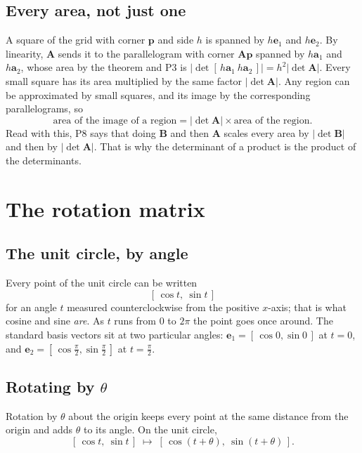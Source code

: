 \documentclass[11pt]{article}
\theoremstyle{plain}
\theoremstyle{definition}
\theoremstyle{remark}
\newcommand{\vc}[1]{\mathbf{#1}}
\newcommand{\mt}[1]{\mathbf{#1}}
\begin{document}
\subsection{Every area, not just one}
A square of the grid with corner $\vc{p}$ and side $h$ is spanned by $h\vc{e}_1$
and $h\vc{e}_2$. By linearity, $\mt{A}$ sends it to the parallelogram with
corner $\mt{A}\vc{p}$ spanned by $h\vc{a}_1$ and $h\vc{a}_2$, whose area by the
theorem and P3 is $|\det[\,h\vc{a}_1\ h\vc{a}_2\,]|=h^{2}|\det\mt{A}|$. Every
small square has its area multiplied by the same factor $|\det\mt{A}|$. Any
region can be approximated by small squares, and its image by the corresponding
parallelograms, so
\[
  \text{area of the image of a region}=|\det\mt{A}|\times\text{area of the region}.
\]
Read with this, P8 says that doing $\mt{B}$ and then $\mt{A}$ scales every area
by $|\det\mt{B}|$ and then by $|\det\mt{A}|$. That is why the determinant of a
product is the product of the determinants.

\section{The rotation matrix}

\subsection{The unit circle, by angle}
Every point of the unit circle can be written
\[
  [\,\cos t,\ \sin t\,]
\]
for an angle $t$ measured counterclockwise from the positive $x$-axis; that is
what cosine and sine \emph{are}. As $t$ runs from $0$ to $2\pi$ the point goes
once around. The standard basis vectors sit at two particular angles:
$\vc{e}_1=[\,\cos0,\sin0\,]$ at $t=0$, and
$\vc{e}_2=[\,\cos\frac{\pi}{2},\sin\frac{\pi}{2}\,]$ at $t=\frac{\pi}{2}$.

\subsection{Rotating by \texorpdfstring{$\theta$}{theta}}
Rotation by $\theta$ about the origin keeps every point at the same distance
from the origin and adds $\theta$ to its angle. On the unit circle,
\[
  [\,\cos t,\ \sin t\,]\;\longmapsto\;[\,\cos(t+\theta),\ \sin(t+\theta)\,].
\]
\end{document}
